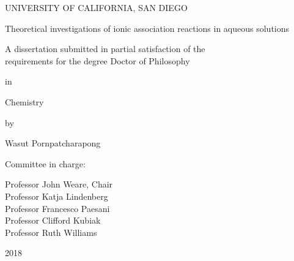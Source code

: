 \frontmatter



\begin{titlepage}\begin{center}
    UNIVERSITY OF CALIFORNIA, SAN DIEGO

    \vspace{1cm}

    {Theoretical investigations of ionic association reactions in aqueous solutions}

    \vspace{1cm}

    {A dissertation submitted in partial satisfaction of the \\
    requirements for the degree Doctor of Philosophy}

    \vspace{1.3cm}

    in

    \vspace{0.7cm}

    Chemistry

    \vspace{1.3cm}

    by

    \vspace{0.7cm}

    Wasut Pornpatcharapong
\end{center}

\vspace{1.3cm}

\noindent Committee in charge:

\noindent\hspace{0.5in} Professor John Weare, Chair \\
\noindent\hspace*{0.5in} Professor Katja Lindenberg \\
\noindent\hspace*{0.5in} Professor Francesco Paesani \\
\noindent\hspace*{0.5in} Professor Clifford Kubiak \\
\noindent\hspace*{0.5in} Professor Ruth Williams

\vspace{0.7cm}

\begin{center}
    2018
\end{center}\end{titlepage}
